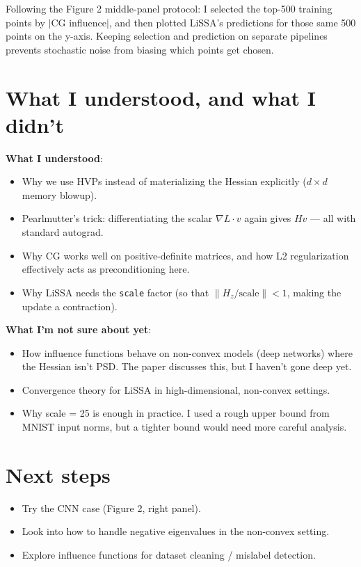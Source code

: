 \documentclass[a4paper,11pt]{article}
\begin{document}
Following the Figure 2 middle-panel protocol: I selected the top-500 training points
by $|$CG influence$|$, and then plotted LiSSA's predictions for those same 500 points
on the y-axis. Keeping selection and prediction on separate pipelines prevents
stochastic noise from biasing which points get chosen.

\section{What I understood, and what I didn't}

\textbf{What I understood}:
\begin{itemize}[leftmargin=1.3em, itemsep=2pt]
  \item Why we use HVPs instead of materializing the Hessian explicitly
        ($d \times d$ memory blowup).
  \item Pearlmutter's trick: differentiating the scalar $\nabla L \cdot v$ again
        gives $Hv$ --- all with standard autograd.
  \item Why CG works well on positive-definite matrices, and how L2 regularization
        effectively acts as preconditioning here.
  \item Why LiSSA needs the \texttt{scale} factor
        (so that $\|H_z / \text{scale}\| < 1$, making the update a contraction).
\end{itemize}

\textbf{What I'm not sure about yet}:
\begin{itemize}[leftmargin=1.3em, itemsep=2pt]
  \item How influence functions behave on non-convex models (deep networks)
        where the Hessian isn't PSD. The paper discusses this, but I haven't
        gone deep yet.
  \item Convergence theory for LiSSA in high-dimensional, non-convex settings.
  \item Why scale = 25 is enough in practice. I used a rough upper bound
        from MNIST input norms, but a tighter bound would need more careful analysis.
\end{itemize}

\section{Next steps}

\begin{itemize}[leftmargin=1.3em, itemsep=2pt]
  \item Try the CNN case (Figure 2, right panel).
  \item Look into how to handle negative eigenvalues in the non-convex setting.
  \item Explore influence functions for dataset cleaning / mislabel detection.
\end{itemize}
\end{document}
